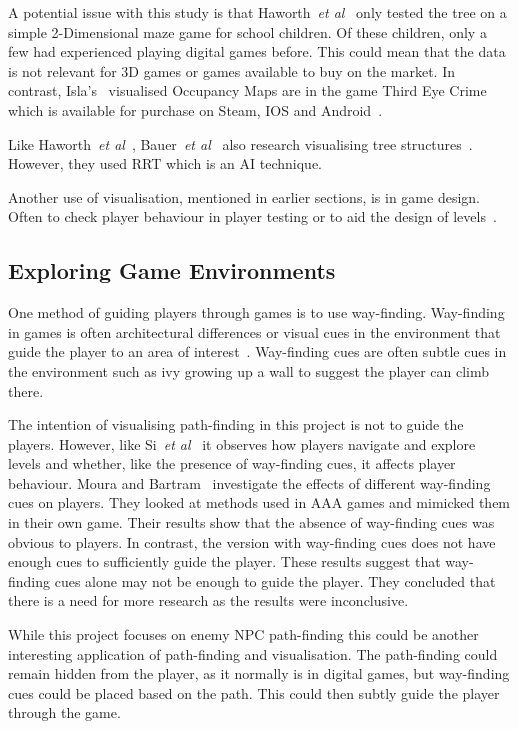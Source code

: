 \documentclass[journal]{IEEEtran}
\begin{document}
	A potential issue with this study is that Haworth~\textit{et al}~\cite{Haworth2010} only tested the tree on a simple 2-Dimensional maze game for school children. Of these children, only a few had experienced playing digital games before.  This could mean that the data is not relevant for 3D games or games available to buy on the market.  In contrast, Isla's~\cite{Isla2014} visualised Occupancy Maps are in the game Third Eye Crime which is available for purchase on Steam, IOS and Android~\cite{Isla2014, game:ThirdEyeCrime}.
	
	Like Haworth~\textit{et al}~\cite{Haworth2010}, Bauer~\textit{et al}~\cite{bauer2012} also research visualising tree structures~\cite{bauer2012}. However, they used RRT which is an AI technique.
	
	Another use of visualisation, mentioned in earlier sections, is in game design. Often to check player behaviour in player testing or to aid the design of levels~\cite{Nelson2011,bauer2012, Tremblay2013, Tremblay2014}. 
	
	\subsection{Exploring Game Environments} \label{Exploring}
	One method of guiding players through games is to use way-finding. Way-finding in games is often architectural differences or visual cues in the environment that guide the player to an area of interest~\cite{si2017, Bacim2008}. Way-finding cues are often subtle cues in the environment such as ivy growing up a wall to suggest the player can climb there.
	
	The intention of visualising path-finding in this project is not to guide the players. However, like Si~\textit{et al}~\cite{si2017} it observes how players navigate and explore levels and whether, like the presence of way-finding cues, it affects player behaviour. 
	Moura and Bartram~\cite{moura2014} investigate the effects of different way-finding cues on players. They looked at methods used in AAA games and mimicked them in their own game. Their results show that the absence of way-finding cues was obvious to players. In contrast, the version with way-finding cues does not have enough cues to sufficiently guide the player. These results suggest that way-finding cues alone may not be enough to guide the player. They concluded that there is a need for more research as the results were inconclusive. 
	
	While this project focuses on enemy NPC path-finding this could be another interesting application of path-finding and visualisation. The path-finding could remain hidden from the player, as it normally is in digital games, but way-finding cues could be placed based on the path. This could then subtly guide the player through the game.
	
\end{document}
